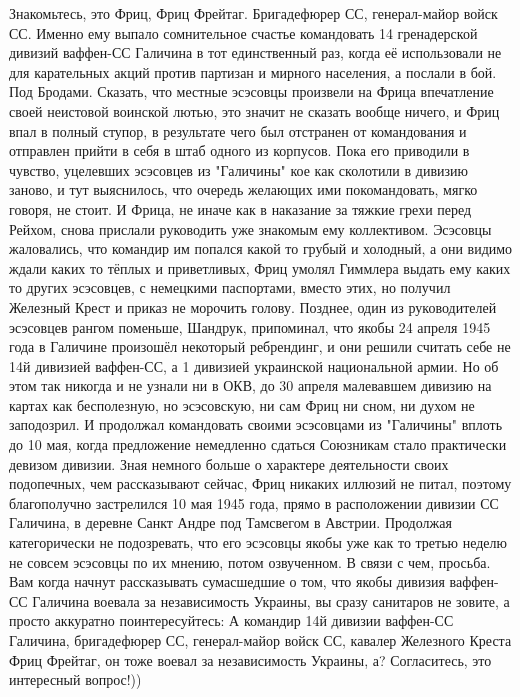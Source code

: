 Знакомьтесь, это Фриц, Фриц Фрейтаг.
Бригадефюрер СС, генерал-майор войск СС.
Именно ему выпало сомнительное счастье командовать 14 гренадерской дивизий ваффен-СС Галичина в тот единственный раз, когда её использовали не для карательных акций против партизан и мирного населения, а послали в бой.
Под Бродами.
Сказать, что местные эсэсовцы произвели на Фрица впечатление своей неистовой воинской лютью, это значит не сказать вообще ничего, и Фриц впал в полный ступор, в результате чего был отстранен от командования и отправлен прийти в себя в штаб одного из корпусов.
Пока его приводили в чувство, уцелевших эсэсовцев из "Галичины" кое как сколотили в дивизию заново, и тут выяснилось, что очередь желающих ими покомандовать, мягко говоря, не стоит.
И Фрица, не иначе как в наказание за тяжкие грехи перед Рейхом, снова прислали руководить уже знакомым ему коллективом.
Эсэсовцы жаловались, что командир им попался какой то грубый и холодный, а они видимо ждали каких то тёплых и приветливых, Фриц умолял Гиммлера выдать ему каких то других эсэсовцев, с немецкими паспортами, вместо этих, но получил Железный Крест и приказ не морочить голову.
Позднее, один из руководителей эсэсовцев рангом поменьше, Шандрук, припоминал, что якобы 24 апреля 1945 года в Галичине произошёл некоторый ребрендинг, и они решили считать себе не 14й дивизией ваффен-СС, а 1 дивизией украинской национальной армии.
Но об этом так никогда и не узнали ни в ОКВ, до 30 апреля малевавшем дивизию на картах как бесполезную, но эсэсовскую, ни сам Фриц ни сном, ни духом не заподозрил.
И продолжал командовать своими эсэсовцами из "Галичины" вплоть до 10 мая, когда предложение немедленно сдаться Союзникам стало практически девизом дивизии.
Зная немного больше о характере деятельности своих подопечных, чем рассказывают сейчас, Фриц никаких иллюзий не питал, поэтому благополучно застрелился 10 мая 1945 года, прямо в расположении дивизии СС Галичина, в деревне Санкт Андре под Тамсвегом в Австрии.
Продолжая категорически не подозревать, что его эсэсовцы якобы уже как то третью неделю не совсем эсэсовцы по их мнению, потом озвученном.
В связи с чем, просьба.
Вам когда начнут рассказывать сумасшедшие о том, что якобы дивизия ваффен-СС Галичина воевала за независимость Украины, вы сразу санитаров не зовите, а просто аккуратно поинтересуйтесь:
А командир 14й дивизии ваффен-СС Галичина, бригадефюрер СС, генерал-майор войск СС, кавалер Железного Креста Фриц Фрейтаг, он тоже воевал за независимость Украины, а?
Согласитесь, это интересный вопрос!))
